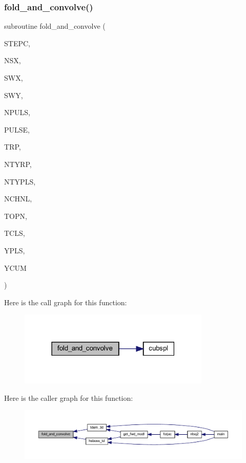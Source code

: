 \subsubsection{\texorpdfstring{fold\+\_\+and\+\_\+convolve()}{fold\_and\_convolve()}}
{\footnotesize\ttfamily subroutine fold\+\_\+and\+\_\+convolve (\begin{DoxyParamCaption}\item[{integer}]{S\+T\+E\+PC,  }\item[{integer}]{N\+SX,  }\item[{real, dimension(nsx)}]{S\+WX,  }\item[{real, dimension(nsx,3)}]{S\+WY,  }\item[{integer}]{N\+P\+U\+LS,  }\item[{real}]{P\+U\+L\+SE,  }\item[{real, dimension(ntyrp)}]{T\+RP,  }\item[{integer}]{N\+T\+Y\+RP,  }\item[{integer}]{N\+T\+Y\+P\+LS,  }\item[{integer}]{N\+C\+H\+NL,  }\item[{real, dimension(nchnl)}]{T\+O\+PN,  }\item[{real, dimension(nchnl)}]{T\+C\+LS,  }\item[{real, dimension(4,ntyrp)}]{Y\+P\+LS,  }\item[{real, dimension(nchnl)}]{Y\+C\+UM }\end{DoxyParamCaption})}

Here is the call graph for this function\+:\nopagebreak
\begin{figure}[H]
\begin{center}
\leavevmode
\includegraphics[width=259pt]{Leroi_8f90_adf5b72e5e0c8b51d6d076cc274531811_cgraph}
\end{center}
\end{figure}
Here is the caller graph for this function\+:\nopagebreak
\begin{figure}[H]
\begin{center}
\leavevmode
\includegraphics[width=350pt]{Leroi_8f90_adf5b72e5e0c8b51d6d076cc274531811_icgraph}
\end{center}
\end{figure}
\mbox{\label{Leroi_8f90_a2ce05aab7ca8a8111b718d33c0f7029c}} 
